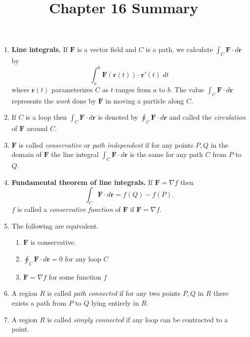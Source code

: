 \documentclass[12pt]{article}
\title{Chapter 16 Summary}
\author{}\date{}
\begin{document}
\maketitle
\thispagestyle{empty}

\begin{enumerate}
\item{\bf Line integrals.}
If $\mathbold{F}$ is a vector field and
$C$ is a path, we calculate $\int_C\mathbold{F}\cdot d\mathbold{r}$ by
\[\int_a^b\mathbold{F}\left(\mathbold{r}\left(t\right)\right)
\cdot\mathbold{r}'\left(t\right)\;dt\]
where $\mathbold{r}\left(t\right)$ parameterizes $C$
as $t$ ranges from $a$ to $b$.
The value $\int_C\mathbold{F}\cdot d\mathbold{r}$ represents
the {\em work} done by $\mathbold{F}$ in moving a particle along $C$.

\item If $C$ is a loop then
$\int_C\mathbold{F}\cdot d\mathbold{r}$
is denoted by
$\oint_C\mathbold{F}\cdot d\mathbold{r}$ and called the
{\em circulation} of $\mathbold{F}$ around $C$.

\item $\mathbold{F}$ is called {\em conservative} or {\em
path independent} if for any points $P,Q$ in the domain of $\mathbold{F}$
the line integral
$\int_C\mathbold{F}\cdot d\mathbold{r}$ is the same for any
path $C$ from $P$ to $Q$.

\item{\bf Fundamental theorem of line integrals.}
If $\mathbold{F}=\nabla f$ then
\[\int_C\mathbold{F}\cdot d\mathbold{r}=f\left(Q\right)-f\left(P\right).\]
$f$ is called a {\em conservative function}
of $\mathbold{F}$ if $\mathbold{F}=\nabla f$.

\item The following are equivalent.
\begin{enumerate}
\item $\mathbold{F}$ is conservative.
\item $\oint_C\mathbold{F}\cdot d\mathbold{r}=0$
for any loop $C$
\item $\mathbold{F}=\nabla f$ for some function $f$
\end{enumerate}

\item A region $R$ is called {\em path connected}
if for any two points $P,Q$ in $R$ there exists
a path from $P$ to $Q$ lying entirely in $R$.

\item A region $R$ is called {\em simply connected}
if any loop can be contracted to a point.


\end{enumerate}
\end{document}
